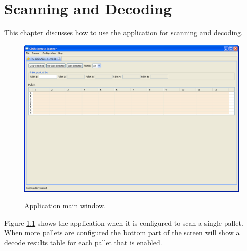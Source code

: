 \chapter{Scanning and Decoding}
This chapter discusses how to use the application for scanning and decoding.

\begin{figure}[H]
  \centering
  \scalebox{0.35}
	   { \includegraphics*{screenshots/scan_and_decode/main_window} }
	   \caption{Application main window.}
	   \label{fig:main_window_2}
\end{figure}
Figure \ref{fig:main_window_2} shows the application when it is configured to
scan a single pallet. When more pallets are configured the bottom part of the
screen will show a decode results table for each pallet that is enabled.

